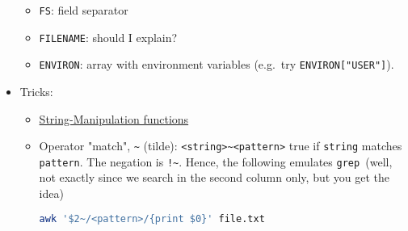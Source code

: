 \documentclass[a4paper,12pt,%
              final%
              ]{article}
\begin{document}
\begin{itemize}
\begin{itemize}
      \item \verb|FS|: field separator
      \item \verb|FILENAME|: should I explain?
      \item \verb|ENVIRON|: array with environment variables (e.g.\ try \verb|ENVIRON["USER"]|).
    \end{itemize}
  \item Tricks:
    \begin{itemize}
      \item \href{https://www.gnu.org/software/gawk/manual/html_node/String-Functions.html}{String-Manipulation functions}
      \item Operator "match", \verb|~| (tilde): \verb|<string>~<pattern>| true if \verb|string| matches \verb|pattern|. The negation is \verb|!~|. Hence, the following emulates \texttt{grep }(well, not exactly since we search in the second column only, but you get the idea)
\begin{lstlisting}[language=bash]
awk '$2~/<pattern>/{print $0}' file.txt
\end{lstlisting}
    \end{itemize}
\end{itemize}

\end{document}
